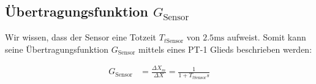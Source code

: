 	\subsection*{Übertragungsfunktion $G_{\mathrm{Sensor}}$ }\label{sub:transfer_Gsensor}
	Wir wissen, dass der Sensor eine Totzeit $T_{t\mathrm{Sensor}}$ von $2.5 \si{\milli\second}$ aufweist. Somit kann seine Übertragungsfunktion $G_{\mathrm{Sensor}}$ mittels eines PT-1 Glieds beschrieben werden:

	\begin{align}\label{eq:G_sens} 
	G_{\mathrm{Sensor}} &= \frac{\Delta X_{m}}{\Delta X} = \frac{1}{1 + T_{t\mathrm{Sensor}}s}
	\end{align}









